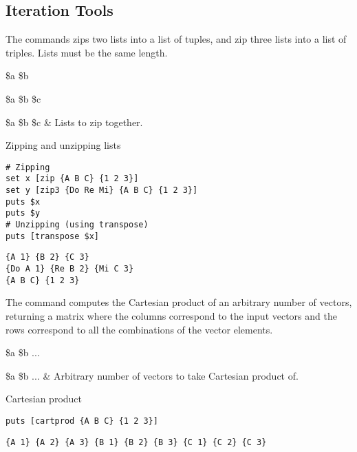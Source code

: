 \subsection{Iteration Tools}
The commands  zips two lists into a list of tuples, and  zip three lists into a list of triples. 
Lists must be the same length.
\begin{syntax}
 \$a \$b
\end{syntax}
\begin{syntax}
 \$a \$b \$c
\end{syntax}
\begin{args}
\$a \$b \$c & Lists to zip together.
\end{args}
\begin{example}{Zipping and unzipping lists}
\begin{lstlisting}
# Zipping
set x [zip {A B C} {1 2 3}]
set y [zip3 {Do Re Mi} {A B C} {1 2 3}]
puts $x
puts $y
# Unzipping (using transpose)
puts [transpose $x]
\end{lstlisting}
\tcblower
\begin{lstlisting}
{A 1} {B 2} {C 3}
{Do A 1} {Re B 2} {Mi C 3}
{A B C} {1 2 3}
\end{lstlisting}
\end{example}
The command  computes the Cartesian product of an arbitrary number of vectors, returning a matrix where the columns correspond to the input vectors and the rows correspond to all the combinations of the vector elements.
\begin{syntax}
 \$a \$b ...
\end{syntax}
\begin{args}
\$a \$b ... & Arbitrary number of vectors to take Cartesian product of.
\end{args}

\begin{example}{Cartesian product}
\begin{lstlisting}
puts [cartprod {A B C} {1 2 3}]
\end{lstlisting}
\tcblower
\begin{lstlisting}
{A 1} {A 2} {A 3} {B 1} {B 2} {B 3} {C 1} {C 2} {C 3}
\end{lstlisting}
\end{example}

\clearpage